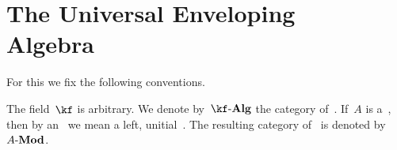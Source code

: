 \chapter[The Universal Enveloping Algebra]{The Universal Enveloping \texorpdfstring{\\}{} Algebra}
\label{universal enveloping algebra}


\begin{convention}
	For this  we fix the following conventions.
	
	The field~$\kf$ is arbitrary.
	We denote by~$\cAlg{\kf}$ the category of~\algebras{$\kf$}.
	If~$A$ is a~\algebra{$\kf$}, then by an~ we mean a left, unitial~.
	The resulting category of~ is denoted by~$A\text{-}\mathbf{Mod}$.
\end{convention}





